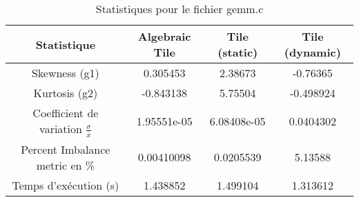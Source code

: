 \documentclass{article}
\begin{document}
\begin{table}[htbp]
  \centering
  \caption{Statistiques pour le fichier gemm.c}
  \begin{tabular}{|c|c|c|c|}
    \hline
    Statistique & Algebraic Tile & Tile (static) & Tile (dynamic) \\ 
    \hline
    Skewness (g1) & 0.305453 & 2.38673 & -0.76365 \\ 
    Kurtosis (g2) & -0.843138 & 5.75504 & -0.498924 \\ 
    Coefficient de variation $ \frac{\sigma}{\overline{x}} $ & 1.95551e-05 & 6.08408e-05 & 0.0404302\\ 
    Percent Imbalance metric en \% & 0.00410098 & 0.0205539 & 5.13588\\ 
    Temps d'exécution (s) &  1.438852    &  1.499104   &  1.313612   \\ 
    \hline
  \end{tabular}
\end{table}
\newpage
\end{document}
